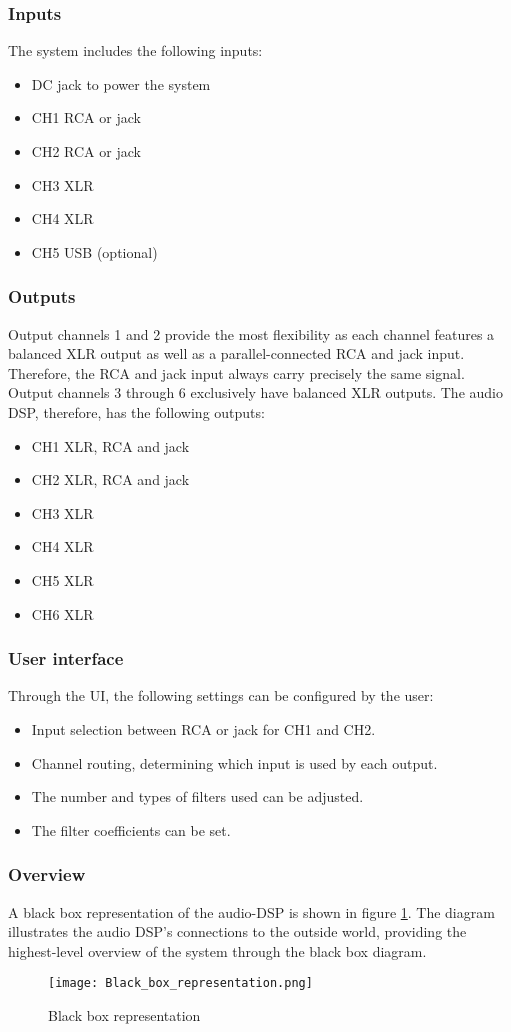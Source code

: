 \subsubsection{Inputs}
The system includes the following inputs:
\begin{itemize}
    \item DC jack to power the system
    \item CH1 RCA or jack
    \item CH2 RCA or jack
    \item CH3 XLR
    \item CH4 XLR
    \item CH5 USB (optional)
\end{itemize}

\subsubsection{Outputs}
Output channels 1 and 2 provide the most flexibility as each channel features a balanced XLR output as well as a parallel-connected RCA and jack input. Therefore, the RCA and jack input always carry precisely the same signal. Output channels 3 through 6 exclusively have balanced XLR outputs. The audio DSP, therefore, has the following outputs:

\begin{itemize}
    \item CH1 XLR, RCA and jack
    \item CH2 XLR, RCA and jack
    \item CH3 XLR
    \item CH4 XLR
    \item CH5 XLR
    \item CH6 XLR
\end{itemize}

\subsubsection{User interface}
Through the UI, the following settings can be configured by the user:
\begin{itemize}
    \item Input selection between RCA or jack for CH1 and CH2.
    \item Channel routing, determining which input is used by each output.
    \item The number and types of filters used can be adjusted.
    \item The filter coefficients can be set.
\end{itemize}

\subsubsection{Overview}
A black box representation of the audio-DSP is shown in figure \ref{fig:Black-box-rep}. The diagram illustrates the audio DSP's connections to the outside world, providing the highest-level overview of the system through the black box diagram.
\begin{figure}[ht]
    \centering\texttt{[image: Black\_box\_representation.png]}
    \caption{Black box representation}
    \label{fig:Black-box-rep}
\end{figure}